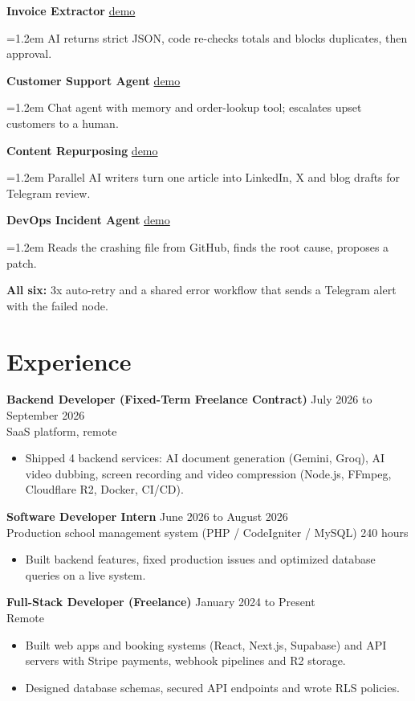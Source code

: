 \documentclass[10pt,a4paper]{article}
\newcommand{\role}[4]{%
  \textbf{#1} \hfill #2\\
  #3 \hfill #4\par\vspace{2pt}%
}
\newcommand{\project}[3]{%
  \vspace{4pt}%
  {\bfseries #1} \hfill {\small #3}\par
  \vspace{1pt}%
  \hangindent=1.2em \hangafter=1 \hspace{0.6em}\textbullet\hspace{0.4em}#2\par
}
\begin{document}
\project{Invoice Extractor}{AI returns strict JSON, code re-checks totals and blocks duplicates, then approval.}{\href{https://rhnl-s.vercel.app/work/invoice-extractor}{demo}}

\project{Customer Support Agent}{Chat agent with memory and order-lookup tool; escalates upset customers to a human.}{\href{https://rhnl-s.vercel.app/work/support-agent}{demo}}

\project{Content Repurposing}{Parallel AI writers turn one article into LinkedIn, X and blog drafts for Telegram review.}{\href{https://rhnl-s.vercel.app/work/content-engine}{demo}}

\project{DevOps Incident Agent}{Reads the crashing file from GitHub, finds the root cause, proposes a patch.}{\href{https://rhnl-s.vercel.app/work/devops-agent}{demo}}

\vspace{2pt}
\textbf{All six:} 3x auto-retry and a shared error workflow that sends a Telegram alert with the failed node.

\section{Experience}

\role{Backend Developer (Fixed-Term Freelance Contract)}{July 2026 to September 2026}{SaaS platform, remote}{}
\begin{itemize}
  \item Shipped 4 backend services: AI document generation (Gemini, Groq), AI video dubbing, screen recording and video compression (Node.js, FFmpeg, Cloudflare R2, Docker, CI/CD).
\end{itemize}

\vspace{2pt}
\role{Software Developer Intern}{June 2026 to August 2026}{Production school management system (PHP / CodeIgniter / MySQL)}{240 hours}
\begin{itemize}
  \item Built backend features, fixed production issues and optimized database queries on a live system.
\end{itemize}

\vspace{2pt}
\role{Full-Stack Developer (Freelance)}{January 2024 to Present}{Remote}{}
\begin{itemize}
  \item Built web apps and booking systems (React, Next.js, Supabase) and API servers with Stripe payments, webhook pipelines and R2 storage.
  \item Designed database schemas, secured API endpoints and wrote RLS policies.
\end{itemize}
\end{document}
